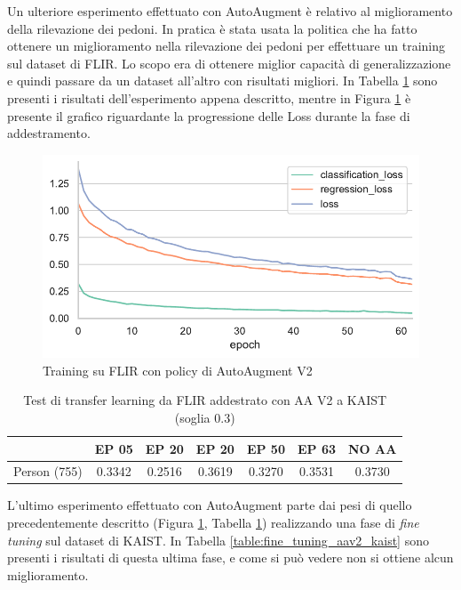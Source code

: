 Un ulteriore esperimento effettuato con AutoAugment è relativo al miglioramento della rilevazione dei pedoni. In pratica è stata usata la politica che ha fatto ottenere un miglioramento nella rilevazione dei pedoni per effettuare un training sul dataset di FLIR. Lo scopo era di ottenere miglior capacità di generalizzazione e quindi passare da un dataset all'altro con risultati migliori. In Tabella \ref{table:tl_flir_kaist_aav2} sono presenti i risultati dell'esperimento appena descritto, mentre in Figura \ref{fig:AA_v2} è presente il grafico riguardante la progressione delle Loss durante la fase di addestramento. 
\begin{figure}[]
    \centering
    \includegraphics[width=\textwidth]{images/graphic/train_aa_flir_v2.pdf}
    \caption{Training su FLIR con policy di AutoAugment V2}
    \label{fig:AA_v2}
\end{figure}

\begin{table}[]
    \begin{tabular}{c|c|c|c|c|c|c|}
    \cline{2-7}
     & EP 05 & EP 20 & EP 20 & EP 50 & EP 63 & NO AA\\ \hline
    \multicolumn{1}{|c|}{Person (755)} & 0.3342 & 0.2516 & 0.3619 & 0.3270 & 0.3531 & 0.3730 \\ \hline
    \end{tabular}
    \caption{Test di transfer learning da FLIR addestrato con AA V2 a KAIST (soglia 0.3)}
    \label{table:tl_flir_kaist_aav2}
\end{table}

L'ultimo esperimento effettuato con AutoAugment parte dai pesi di quello precedentemente descritto (Figura \ref{fig:AA_v2}, Tabella \ref{table:tl_flir_kaist_aav2}) realizzando una fase di \textit{fine tuning} sul dataset di KAIST. In Tabella \ref{table:fine_tuning_aav2_kaist} sono presenti i risultati di questa ultima fase, e come si può vedere non si ottiene alcun miglioramento. 

